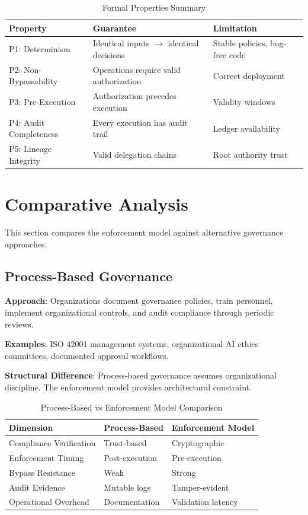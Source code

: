 \documentclass[11pt,letterpaper]{article}
\begin{document}
\begin{table}[htbp]
\centering
\caption{Formal Properties Summary}
\label{tab:properties}
\begin{tabular}{@{}lll@{}}
\toprule
\textbf{Property} & \textbf{Guarantee} & \textbf{Limitation} \\
\midrule
P1: Determinism & Identical inputs $\rightarrow$ identical decisions & Stable policies, bug-free code \\
P2: Non-Bypassability & Operations require valid authorization & Correct deployment \\
P3: Pre-Execution & Authorization precedes execution & Validity windows \\
P4: Audit Completeness & Every execution has audit trail & Ledger availability \\
P5: Lineage Integrity & Valid delegation chains & Root authority trust \\
\bottomrule
\end{tabular}
\end{table}

\section{Comparative Analysis}
\label{sec:comparison}

This section compares the enforcement model against alternative governance approaches.

\subsection{Process-Based Governance}

\textbf{Approach}: Organizations document governance policies, train personnel, implement organizational controls, and audit compliance through periodic reviews.

\textbf{Examples}: ISO 42001 management systems, organizational AI ethics committees, documented approval workflows.

\textbf{Structural Difference}: Process-based governance assumes organizational discipline. The enforcement model provides architectural constraint.

\begin{table}[htbp]
\centering
\caption{Process-Based vs Enforcement Model Comparison}
\label{tab:process_comparison}
\begin{tabular}{@{}lll@{}}
\toprule
\textbf{Dimension} & \textbf{Process-Based} & \textbf{Enforcement Model} \\
\midrule
Compliance Verification & Trust-based & Cryptographic \\
Enforcement Timing & Post-execution & Pre-execution \\
Bypass Resistance & Weak & Strong \\
Audit Evidence & Mutable logs & Tamper-evident \\
Operational Overhead & Documentation & Validation latency \\
\bottomrule
\end{tabular}
\end{table}
\end{document}
